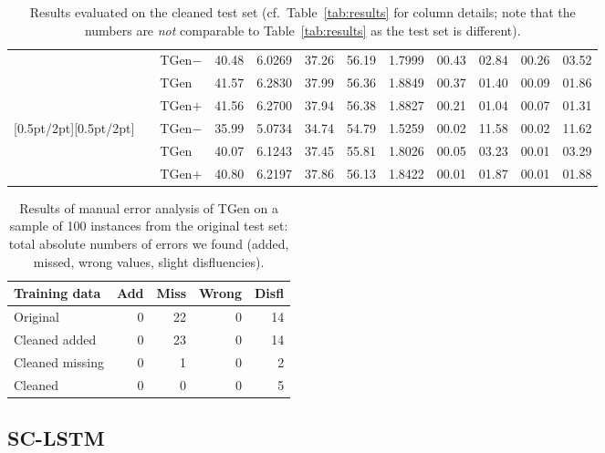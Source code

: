 \documentclass[11pt,a4paper]{article}
\newcommand\Tstrut{\rule{0pt}{2.3ex}}       \newcommand\Bstrut{\rule[-1.5ex]{0pt}{0pt}}
\begin{document}
\begin{table*}[tb]
\begin{tabular}{lcl|ccccc|cccc}
 & & TGen$-$  & 40.48 & 6.0269 & 37.26 & 56.19 & 1.7999 & 00.43 & 02.84 & 00.26 & 03.52\Tstrut  \\ &   & TGen     & 41.57 & 6.2830 & 37.99 & 56.36 & 1.8849 & 00.37 & 01.40 & 00.09 & 01.86  \\ &   & TGen$+$  & 41.56 & 6.2700 & 37.94 & 56.38 & 1.8827 & 00.21 & 01.04 & 00.07 & 01.31  \\[0.5pt/2pt][0.5pt/2pt]   & & TGen$-$  & 35.99 & 5.0734 & 34.74 & 54.79 & 1.5259 & 00.02 & 11.58 & 00.02 & 11.62\Tstrut  \\ &   & TGen     & 40.07 & 6.1243 & 37.45 & 55.81 & 1.8026 & 00.05 & 03.23 & 00.01 & 03.29  \\ &   & TGen$+$  & 40.80 & 6.2197 & 37.86 & 56.13 & 1.8422 & 00.01 & 01.87 & 00.01 & 01.88  \\\hline \end{tabular}
\caption{Results evaluated on the cleaned test set (cf.~Table~\ref{tab:results} for column details; note that the numbers are \emph{not} comparable to Table~\ref{tab:results} as the test set is different).
}
\label{tab:results-clean-testset}
\end{table*}


\begin{table}[tb]
\vspace{-2mm}
\footnotesize\centering
\begin{tabular}{lrrrr}\hline
\bf Training data & \bf Add & \bf Miss & \bf Wrong & \bf Disfl  \\\hline
Original        & 0 & 22 & 0 & 14\Tstrut \\
Cleaned added   & 0 & 23 & 0 & 14 \\
Cleaned missing & 0 &  1 & 0 &  2 \\
Cleaned         & 0 &  0 & 0 &  5 \\\hline
\end{tabular}
\caption{Results of manual error analysis of TGen on a sample of 100 instances from the original test set: total absolute numbers of errors we found (added, missed, wrong values, slight disfluencies).}
\label{tab:manual-results}
\vspace{-3mm}
\end{table}

\subsection{SC-LSTM}
\label{sec:sclstm}
\end{document}
